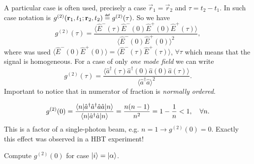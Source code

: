 A particular case is often used, precisely a case $\vec{r}_1 = \vec{r}_2$ and $\tau = t_2 - t_1$. In such case notation is $g^{(2)} (\vec{r}_1, t_1; \vec{r}_2, t_2) \myeq g^{(2)} (\tau)$. So we have
\begin{equation}
	g^{(2)} (\tau) = \frac{\langle \hat{E}^-(\tau) \hat{E}^-(0) \hat{E}^+(0) \hat{E}^+(\tau)\rangle}{\langle \hat{E}^-(0) \hat{E}^+(0) \rangle^2},
\end{equation}
where was used $\langle \hat{E}^-(0) \hat{E}^+(0) \rangle = \langle \hat{E}^-(\tau) \hat{E}^+(\tau) \rangle$, $\forall \tau$ which means that the signal is homogeneous. For a case of only \textit{one mode field} we can write
\begin{equation}
	g^{(2)} (\tau) = \frac{\langle \hat{a}^{\dagger} (\tau) \hat{a}^{\dagger} (0) \hat{a}(0) \hat{a}(\tau) \rangle}{\langle \hat{a}^{\dagger} \hat{a} \rangle^2}.
\end{equation}
Important to notice that in numerator of fraction is \textit{normally ordered}.

\begin{testexample}[The second-order correlation function for Fock states ($\ket{i} = \ket{n}$).]
	\begin{equation}
		g^{(2)} (0) = \frac{\langle n\rvert \hat{a}^{\dagger} \hat{a}^{\dagger} \hat{a} \hat{a} \lvert n\rangle}{\langle n\rvert\hat{a}^{\dagger} \hat{a} \lvert n\rangle} = \frac{n(n-1)}{n^2} = 1 - \frac{1}{n} < 1, \quad \forall n.
	\end{equation}
	This is a factor of a single-photon beam, e.g. $n=1 \to g^{(2)}(0)=0$. Exactly this effect was observed in a HBT experiment!
\end{testexample}

\begin{hw}
	Compute $g^{(2)}(0)$ for case $\lvert i\rangle = \lvert\alpha\rangle$.
\end{hw}